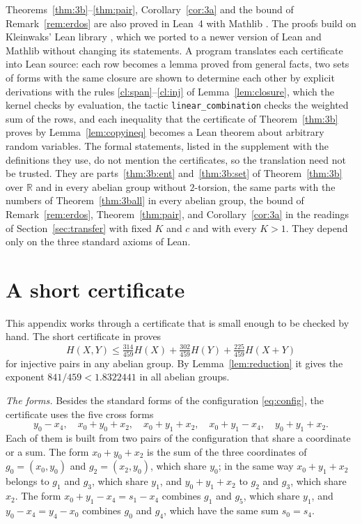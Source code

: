 \documentclass[11pt]{amsart}
\theoremstyle{definition}
\theoremstyle{remark}
\numberwithin{equation}{section}
\newcommand{\R}{\mathbb{R}}
\newcommand{\CrSlash}{841/459}
\newcommand{\CrUp}{1.8322441}
\begin{document}
Theorems~\ref{thm:3b}--\ref{thm:pair}, Corollary~\ref{cor:3a} and the bound of Remark~\ref{rem:erdos} are also proved in Lean~4 \cite{Lean4} with Mathlib \cite{Mathlib}. The proofs build on Kleinwaks' Lean library \cite{Kle26}, which we ported to a newer version of Lean and Mathlib without changing its statements. A program translates each certificate into Lean source: each row becomes a lemma proved from general facts, two sets of forms with the same closure are shown to determine each other by explicit derivations with the rules \ref{cl:span}--\ref{cl:inj} of Lemma~\ref{lem:closure}, which the kernel checks by evaluation, the tactic \texttt{linear\_combination} checks the weighted sum of the rows, and each inequality that the certificate of Theorem~\ref{thm:3b} proves by Lemma~\ref{lem:copyineq} becomes a Lean theorem about arbitrary random variables. The formal statements, listed in the supplement \cite{Cert} with the definitions they use, do not mention the certificates, so the translation need not be trusted. They are parts~\ref{thm:3b:ent} and~\ref{thm:3b:set} of Theorem~\ref{thm:3b} over $\R$ and in every abelian group without $2$-torsion, the same parts with the numbers of Theorem~\ref{thm:3ball} in every abelian group, the bound of Remark~\ref{rem:erdos}, Theorem~\ref{thm:pair}, and Corollary~\ref{cor:3a} in the readings of Section~\ref{sec:transfer} with fixed $K$ and $c$ and with every $K>1$. They depend only on the three standard axioms of Lean.

\FloatBarrier

\appendix

\section{A short certificate}\label{app:short}

This appendix works through a certificate that is small enough to be checked by hand. The short certificate in \cite{Cert} proves
\[
H(X,Y)\le\tfrac{314}{459}H(X)+\tfrac{302}{459}H(Y)+\tfrac{225}{459}H(X+Y)
\]
for injective pairs in any abelian group. By Lemma~\ref{lem:reduction} it gives the exponent $\CrSlash<\CrUp$ in all abelian groups.

\emph{The forms.} Besides the standard forms of the configuration \eqref{eq:config}, the certificate uses the five cross forms
\[
y_0-x_4,\quad x_0+y_0+x_2,\quad x_0+y_1+x_2,\quad x_0+y_1-x_4,\quad y_0+y_1+x_2.
\]
Each of them is built from two pairs of the configuration that share a coordinate or a sum. The form $x_0+y_0+x_2$ is the sum of the three coordinates of $g_0=(x_0,y_0)$ and $g_2=(x_2,y_0)$, which share $y_0$; in the same way $x_0+y_1+x_2$ belongs to $g_1$ and $g_3$, which share $y_1$, and $y_0+y_1+x_2$ to $g_2$ and $g_3$, which share $x_2$. The form $x_0+y_1-x_4=s_1-x_4$ combines $g_1$ and $g_5$, which share $y_1$, and $y_0-x_4=y_4-x_0$ combines $g_0$ and $g_4$, which have the same sum $s_0=s_4$.
\end{document}

